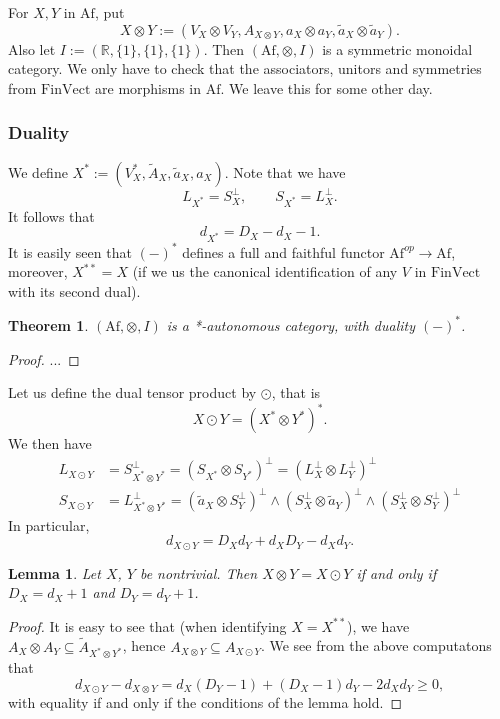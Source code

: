 \documentclass[12pt]{article}
\newtheorem{lemma}{Lemma}
\newtheorem{theorem}{Theorem}
\theoremstyle{definition}
\theoremstyle{remark}
\def \Af{\mathrm{Af}}
\def \FV{\mathrm{FinVect}}
\begin{document}
For $X,Y$ in $\Af$, put 
\[
X\otimes Y:=(V_X\otimes V_Y,A_{X\otimes Y},a_X\otimes a_Y, \tilde
a_X\otimes \tilde a_Y).
\]
Also let $I:=(\mathbb R, \{1\},\{1\},\{1\})$. Then $(\Af,\otimes, I)$ is a symmetric
monoidal category. We only have to check that the associators, unitors and symmetries from
$\FV$ are morphisms in $\Af$. We leave this for some other day.

\subsubsection{Duality}

We define $X^*:=(V_X^*,\tilde A_X,\tilde a_X,a_X)$. Note that we have
\[
L_{X^*}=S_X^\perp,\qquad S_{X^*}=L_X^\perp.
\]
It follows that
\[
d_{X^*}=D_X-d_X-1.
\]
It is easily seen  that $(-)^*$ defines a full and faithful functor $\Af^{op}\to \Af$,
moreover, $X^{**}=X$ (if we us the canonical identification of  any $V$ in $\FV$ with its second dual). 


\begin{theorem} $(\Af,\otimes,I)$ is a *-autonomous category, with duality $(-)^*$.

\end{theorem}


\begin{proof}...

\end{proof}

Let us define the dual tensor product by $\odot$, that is
\[
X\odot Y=(X^*\otimes Y^*)^*.
\]
We then have
\begin{align*}
L_{X\odot Y}&=S^\perp_{X^*\otimes Y^*}=(S_{X^*}\otimes S_{Y^*})^\perp=(L_X^\perp\otimes
L_Y^\perp)^\perp\\
S_{X\odot Y}&= L_{X^*\otimes Y^*}^\perp=(\tilde a_X\otimes
S_Y^\perp)^\perp\wedge(S_X^\perp\otimes \tilde a_Y)^\perp\wedge (S_X^\perp\otimes
S_Y^\perp)^\perp
\end{align*}
In particular,
\[
d_{X\odot Y}=D_Xd_Y+d_XD_Y-d_Xd_Y.
\]
\begin{lemma}\label{lemma:tensors} Let $X$, $Y$ be nontrivial. Then $X\otimes Y=X\odot Y$
if and only if $D_X=d_X+1$ and $D_Y=d_Y+1$.

\end{lemma}

\begin{proof} It is easy to see that (when identifying $X=X^{**}$), we have $A_X\otimes
A_Y\subseteq \tilde A_{X^*\otimes  Y^*}$, hence $A_{X\otimes Y}\subseteq A_{X\odot Y}$. We see from the above computatons that
\[
d_{X\odot Y}-d_{X\otimes Y}=d_X(D_Y-1)+(D_X-1)d_Y-2d_Xd_Y\ge 0,
\]
with equality if and only if the conditions of the lemma hold.

\end{proof}
\end{document}
